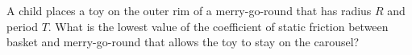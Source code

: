 A child places a toy on the outer rim of a merry-go-round that has
radius $R$ and period $T$. What is the lowest value of the
coefficient of static friction between basket and merry-go-round that
allows the toy to stay on the carousel?
